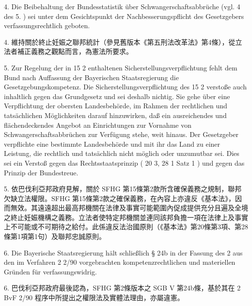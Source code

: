 \documentclass[12pt]{article}
\begin{document}
\begin{sourcepara}[title={原文C.11}]
4. Die Beibehaltung der Bundesstatistik über Schwangerschaftsabbrüche (vgl. \abbrArt{} 4 des 5. \abbrStrRG{} \abbrAF{}) sei unter dem Gesichtspunkt der Nachbesserungspflicht des Gesetzgebers verfassungsrechtlich geboten.
\end{sourcepara}
\begin{transpara}
4. 維持關於終止妊娠之聯邦統計（參見舊版本《第五刑法改革法》第4條），從立法者補正義務之觀點而言，為憲法所要求。
\end{transpara}

\begin{sourcepara}[title={原文C.12}]
5. Zur Regelung der in \abbrArt{} 15 \abbrNr{} 2 \abbrSFHG{} enthaltenen Sicherstellungsverpflichtung fehlt dem Bund nach Auffassung der Bayerischen Staatsregierung die Gesetzgebungskompetenz. Die Sicherstellungsverpflichtung des \abbrArt{} 15 \abbrNr{} 2 \abbrSFHG{} verstoße auch inhaltlich gegen das Grundgesetz und sei deshalb nichtig. Sie gehe über eine Verpflichtung der obersten Landesbehörde, im Rahmen der rechtlichen und tatsächlichen Möglichkeiten darauf hinzuwirken, daß ein ausreichendes und flächendeckendes Angebot an Einrichtungen zur Vornahme von Schwangerschaftsabbrüchen zur Verfügung stehe, weit hinaus. Der Gesetzgeber verpflichte eine bestimmte Landesbehörde und mit ihr das Land zu einer Leistung, die rechtlich und tatsächlich nicht möglich oder unzumutbar sei. Dies sei ein Verstoß gegen das Rechtsstaatsprinzip (\abbrArt{} 20 \abbrAbs{} 3, \abbrArt{} 28 \abbrAbs{} 1 Satz 1 \abbrGG{}\ggfnArtTwentyEightOneDE{}) und gegen das Prinzip der Bundestreue.
\end{sourcepara}
\begin{transpara}
5. 依巴伐利亞邦政府見解，關於 SFHG 第15條第2款所含確保義務之規制，聯邦欠缺立法權限。SFHG 第15條第2款之確保義務，在內容上亦違反《基本法》，因而無效。其遠遠超出最高邦機關在法律及事實可能範圍內促成提供充分且遍及全境之終止妊娠機構之義務。立法者使特定邦機關並連同該邦負擔一項在法律上及事實上不可能或不可期待之給付。此係違反法治國原則（《基本法》第20條第3項\ggfnArtTwentyThreeZH{}、第28條第1項第1句\ggfnArtTwentyEightOneZH{}）及聯邦忠誠原則。
\end{transpara}

\begin{sourcepara}[title={原文C.13}]
6. Die Bayerische Staatsregierung hält schließlich § 24b \abbrSGBV{} in der Fassung des \abbrArt{} 2 \abbrSFHG{} aus den im Verfahren 2 \abbrBvF{} 2/90 vorgebrachten kompetenzrechtlichen und materiellen Gründen für verfassungswidrig.
\end{sourcepara}
\begin{transpara}
6. 巴伐利亞邦政府最後認為，SFHG 第2條版本之 SGB V 第24b條，基於其在 2 BvF 2/90 程序中所提出之權限法及實體法理由，亦屬違憲。
\end{transpara}
\end{document}
